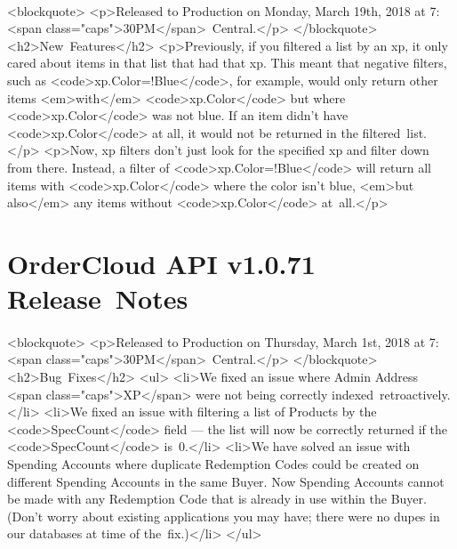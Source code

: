 \documentclass{memoir}%
\begin{document}
\paragraph*{}%
<blockquote>\newline%
<p>Released to Production on Monday, March 19th, 2018 at 7:<span class="caps">30PM</span>~Central.</p>\newline%
</blockquote>\newline%
<h2>New~Features</h2>\newline%
<p>Previously, if you filtered a list by an xp, it only cared about items in that list that had that xp. This meant that negative filters, such as <code>xp.Color=!Blue</code>, for example, would only return other items <em>with</em> <code>xp.Color</code> but where <code>xp.Color</code> was not blue. If an item didn’t have <code>xp.Color</code> at all, it would not be returned in the filtered~list.</p>\newline%
<p>Now, xp filters don’t just look for the specified xp and filter down from there. Instead, a filter of <code>xp.Color=!Blue</code> will return all items with <code>xp.Color</code> where the color isn’t blue, <em>but also</em> any items without <code>xp.Color</code> at~all.</p>

%
\section*{OrderCloud API v1.0.71 Release~Notes}%
\paragraph*{}%

%
\paragraph*{}%
<blockquote>\newline%
<p>Released to Production on Thursday, March 1st, 2018 at 7:<span class="caps">30PM</span>~Central.</p>\newline%
</blockquote>\newline%
<h2>Bug~Fixes</h2>\newline%
<ul>\newline%
<li>We fixed an issue where Admin Address <span class="caps">XP</span> were not being correctly indexed~retroactively.</li>\newline%
<li>We fixed an issue with filtering a list of Products by the <code>SpecCount</code> field — the list will now be correctly returned if the <code>SpecCount</code> is~0.</li>\newline%
<li>We have solved an issue with Spending Accounts where duplicate Redemption Codes could be created on different Spending Accounts in the same Buyer. Now Spending Accounts cannot be made with any Redemption Code that is already in use within the Buyer. (Don’t worry about existing applications you may have; there were no dupes in our databases at time of the~fix.)</li>\newline%
</ul>
\end{document}

